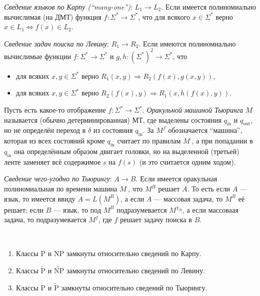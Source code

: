 \documentclass[12pt,a4paper]{article}
\newcommand{\Pclass}{\mathrm{P}}
\newcommand{\NPclass}{\mathrm{NP}}
\newcommand{\Ptilde}{\widetilde{\mathrm{P}}}
\newcommand{\NPtilde}{\widetilde{\mathrm{NP}}}
\begin{document}
    \begin{definition}
        \emph{Сведение языков по Карпу (``many-one'')}: $L_1 \to L_2$. Если имеется полиномиально вычислимая (на ДМТ) функция $f: \Sigma^* \to \Sigma^*$, что для всякого $x \in \Sigma^*$ верно $x \in L_1 \Leftrightarrow f(x) \in L_2$.
        
        \emph{Сведение задач поиска по Левину}: $R_1 \to R_2$. Если имеются полиномиально вычислимые функции $f: \Sigma^* \to \Sigma^*$ и $g, h: (\Sigma^*)^2 \to \Sigma^*$, что
        \begin{itemize}
            \item для всяких $x, y \in \Sigma^*$ верно $R_1(x, y) \Rightarrow R_2(f(x), g(x, y))$,
            \item для всяких $x, y \in \Sigma^*$ верно $R_2(f(x), y) \Rightarrow R_1(x, h(f(x), y))$.
        \end{itemize}

        Пусть есть какое-то отображение $f: \Sigma^* \to \Sigma^*$. \emph{Оракульной машиной Тьюринга} $M^{\cdot}$ называется (обычно детерминированная) МТ, где выделены состояния $q_{\mathrm{in}}$ и $q_{\mathrm{out}}$, но не определён переход в $\delta$ из состояния $q_{\mathrm{in}}$. За $M^f$ обозначается ``машина'', которая из всех состояний кроме $q_{\mathrm{in}}$ считает по правилам $M^\cdot$, а при попадании в $q_{\mathrm{in}}$ она определённым образом двигает головки, но на выделенной (третьей) ленте заменяет всё содержимое $s$ на $f(s)$ (и это считается одним ходом).

        \emph{Сведение чего-угодно по Тьюрингу}: $A \to B$. Если имеется оракульная полиномиальная по времени машина $M^\cdot$, что $M^B$ решает $A$. То есть если $A$ --- язык, то имеется ввиду $A = L(M^B)$, а если $A$ --- массовая задача, то $M^B$ её решает; если $B$ --- язык, то под $M^B$ подразумевается $M^{\chi_B}$, а если массоваая задача, то подразумевается $M^f$, где $f$ решает задачу поиска в $B$.
    \end{definition}

    \begin{theorem}\ 
        \begin{enumerate}
            \item Классы $\Pclass$ и $\NPclass$ замкнуты относительно сведений по Карпу.
            \item Классы $\Ptilde$ и $\NPtilde$ замкнуты относительно сведений по Левину.
            \item Классы $\Pclass$ и $\Ptilde$ замкнуты относительно сведений по Тьюрингу.
        \end{enumerate}
    \end{theorem}
\end{document}
